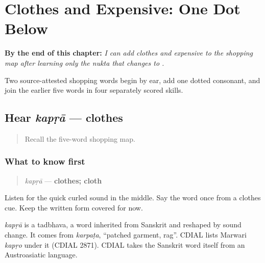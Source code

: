 
\chapter{Clothes and Expensive: One Dot Below}
\label{ch:mw-shopping-seven}

\begin{chapteropening}
\textbf{By the end of this chapter:} \emph{I can add clothes and expensive to the shopping map after learning only the nukta that changes  to .}

Two source-attested shopping words begin by ear, add one dotted consonant, and join the earlier five words in four separately scored skills.
\end{chapteropening}

\section[kapṛā]{Hear \emph{kapṛā} — clothes}

\label{lesson:MW-C15-hear-kapda}



\begin{quote}
Recall the five-word shopping map.
\end{quote}

\subsection*{What to know first}
\begin{quote}
\emph{kapṛā} — \textbf{clothes; cloth}
\end{quote}

Listen for the quick curled sound in the middle. Say the word once from a clothes cue. Keep the written form covered for now.

\begin{cousinweb}
\emph{kapṛā} is a tadbhava, a word inherited from Sanskrit and reshaped by sound change. It comes from \emph{karpaṭa}, \textquotedblleft{}patched garment, rag\textquotedblright{}. CDIAL lists Marwari \emph{kapṛo} under it (CDIAL 2871). CDIAL takes the Sanskrit word itself from an Austroasiatic language.
\end{cousinweb}

